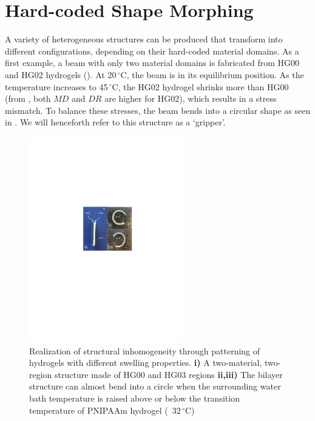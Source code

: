\section{Hard-coded Shape Morphing}
A variety of heterogeneous structures can be produced that transform into different configurations, depending on their hard-coded material domains.
As a first example, a beam with only two material domains is fabricated from HG00 and HG02 hydrogels (). 
At 20\,$^{\circ}$C, the beam is in its equilibrium position. As the temperature increases to 45\,$^{\circ}$C, the HG02 hydrogel shrinks more than HG00 (from , both $MD$ and $DR$ are higher for HG02), 
which results in a stress mismatch. To balance these stresses, the beam bends into a circular shape as seen in .
We will henceforth refer to this structure as a `gripper'. %
\begin{figure}[!ht]
\centering
\includegraphics[width=0.6\textwidth]{bilayer.pdf}
\caption[Realization of structural inhomogeneity]{Realization of structural inhomogeneity through patterning of hydrogels with different swelling properties. \textbf{i)} A two-material, two-region structure made of HG00 and HG03 regions \textbf{ii,iii)} The bilayer structure can almost bend into a circle when the surrounding water bath temperature is raised above or below the transition temperature of PNIPAAm hydrogel (~32\,$^{\circ}$C)}
\label{fig:bilayer}
\end{figure}

